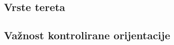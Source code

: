 \documentclass[times, utf8, diplomski, numeric]{templates/template}
\begin{document}
{{        \subsection{Vrste tereta}{
        }
    
        \subsection{Važnost kontrolirane orijentacije}{
        }
    }
}
\end{document}
